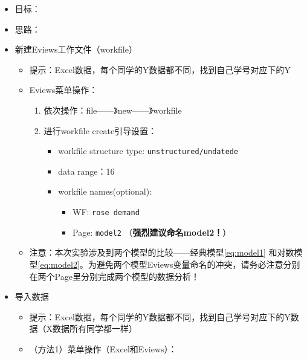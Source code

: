 \documentclass[12pt,(landscape,a4paper),(portrait,a4paper)]{article}
\providecommand{\tightlist}{%
  \setlength{\itemsep}{0pt}\setlength{\parskip}{0pt}}
\begin{document}
\begin{itemize}
\tightlist
\item
  目标：
\item
  思路：
\item
  新建Eviews工作文件（workfile）

  \begin{itemize}
  \tightlist
  \item
    提示：Excel数据，每个同学的Y数据都不同，找到自己学号对应下的Y
  \item
    Eviews菜单操作：

    \begin{enumerate}
    \def\labelenumi{\alph{enumi}.}
    \tightlist
    \item
      依次操作：file------》new------》workfile
    \item
      进行workfile create引导设置：

      \begin{itemize}
      \tightlist
      \item
        workfile structure type: \texttt{unstructured/undatede}
      \item
        data range：16
      \item
        workfile names(optional):

        \begin{itemize}
        \tightlist
        \item
          WF: \texttt{rose\ demand}
        \item
          Page: \texttt{model2} （\textbf{强烈建议命名model2！}）
        \end{itemize}
      \end{itemize}
    \end{enumerate}
  \item
    注意：本次实验涉及到两个模型的比较------经典模型\eqref{eq:model1}
    和对数模型\eqref{eq:model2}。为避免两个模型Eviews变量命名的冲突，请务必注意分别在两个Page里分别完成两个模型的数据分析！
  \end{itemize}
\item
  导入数据

  \begin{itemize}
  \tightlist
  \item
    提示：Excel数据，每个同学的Y数据都不同，找到自己学号对应下的Y数据（X数据所有同学都一样）\\
  \item
    （方法1）菜单操作（Excel和Eviews）：


\end{itemize}
\end{itemize}
\end{document}
